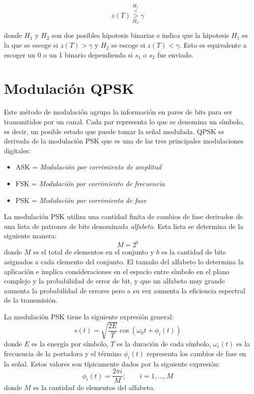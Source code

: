 \begin{equation}
z(T)\overset{H_1}{\underset{H_2}{\overset{<}{>}}}\gamma
\end{equation}\label{eq:ineq}

donde $H_1$ y $H_2$ son dos posibles hipotesis binarias e indica que la hipotesis $H_1$ es la que se
escoge si $z(T)>\gamma$ y $H_2$ se escoge si $z(T)< \gamma$. Esto es equivalente a escoger un 0 o un
1 binario dependiendo si $s_1$ o $s_2$ fue enviado.
\section{Modulaci\'on QPSK}

Este m\'etodo de modulaci\'on agrupa la informaci\'on en pares de
bits para ser transmitidos por un canal. Cada par representa lo que se denomina
un s\'imbolo, es decir, un posible estado que puede tomar la se\~nal modulada.
QPSK es derivada de la modulaci\'on PSK que es una de las tres principales
modulaciones digitales:
\begin{itemize}
  \item ASK = \emph{Modulaci\'on por corrimiento de amplitud}
  \item FSK = \emph{Modulaci\'on por corrimiento de frecuencia}
  \item PSK = \emph{Modulaci\'on por corrimiento de fase}
\end{itemize}

La modulaci\'on PSK utiliza una cantidad finita de cambios de fase derivados de
una lista de patrones de bits denominada \emph{alfabeto}. Esta lista se
determina de la siguiente manera:
\begin{equation}\label{eq:levels}
M=2^b
\end{equation}
donde $M$ es el total de elementos en el conjunto y $b$ es la cantidad de bits
asignados a cada elemento del conjunto. El tama\~no del alfabeto lo determina la
aplicaci\'on e implica consideraciones en el espacio entre s\'imbolo en el plano
complejo y la probabilidad de error de bit, y que un alfabeto muy grande aumenta
la probabilidad de errores pero a su vez aumenta la eficiencia espectral de la
transmisi\'on.

La modulaci\'on PSK tiene la siguiente expresi\'on general:
\begin{equation}\label{eq:pskgen}
s(t)=\sqrt{\frac{2E}{T}}\cos(\omega_0t+\phi_i(t))
\end{equation}
donde $E$ es la energ\'ia por s\'imbolo, $T$ es la duraci\'on de cada s\'imbolo,
$\omega_i(t)$ es la frecuencia de la portadora y el t\'ermino $\phi_i(t)$
representa los cambios de fase en la se\~nal. Estos valores son t\'ipicamente
dados por la siguiente expresi\'on:
\begin{equation}\label{eq:levelfase}
\phi_i(t)=\frac{2\pi i}{M}; \qquad i=1,\ldots,M 
\end{equation}
donde $M$ es la cantidad de elementos del alfabeto.

